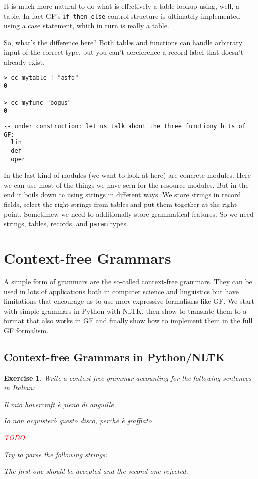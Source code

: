 \documentclass{scrartcl}
\newcommand{\note}[1]{\textcolor{red}{\uppercase{#1}}}
\newtheorem{exercise}{Exercise}
\begin{document}
It is much more natural to do what is effectively a table lookup using, well, a table. In fact GF's \texttt{if\_then\_else} control structure is ultimately implemented using a case statement, which in turn is really a table.

So, what's the difference here? Both tables and functions can handle arbitrary input of the correct type, but you can't dereference a record label that doesn't already exist.

\begin{verbatim}
> cc mytable ! "asfd"
0

> cc myfunc "bogus"
0
\end{verbatim}


\begin{verbatim}
-- under construction: let us talk about the three functiony bits of GF:
  lin
  def
  oper
\end{verbatim}

In the last kind of modules (we want to look at here) are concrete modules. Here we can use most of the things we have seen for the resource modules. But in the end it boils down to using strings in different ways. We store strings in record fields, select the right strings from tables and put them together at the right point. Sometimew we need to additionally store grammatical features. So we need strings, tables, records, and \texttt{param} types.



\section{Context-free Grammars}

A simple form of grammars are the so-called context-free grammars. They can be used in lots of applications both in computer science and linguistics but have limitations that encourage us to use more expressive formalisms like GF. We start with simple grammars in Python with NLTK, then show to translate them to a format that also works in GF and finally show how to implement them in the full GF formalism.

\subsection{Context-free Grammars in Python/NLTK}



\begin{exercise}
  Write a context-free grammar accounting for the following sentences in Italian:

  Il mio hovercraft è pieno di anguille
  
  Io non acquisterò questo disco, perché è graffiato
  
\note{todo}

  Try to parse the following strings:

  
  
  The first one should be accepted and the second one rejected.

\end{exercise}
\end{document}
